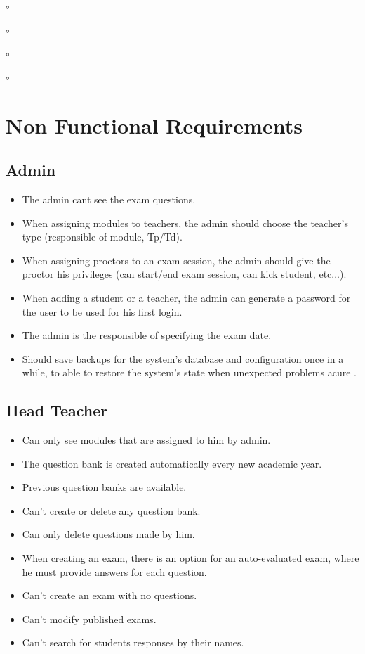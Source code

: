\documentclass[]{uc2pfecaneva}
\begin{document}
\begin{list}{$\circ$}{}
\begin{list}{$\circ$}{}
\begin{list}{$\circ$}{}
\begin{list}{$\circ$}{}
    \raggedright\section{Non Functional Requirements}
    \raggedright\subsection{Admin}
    \begin{itemize}
        \item The admin cant see the exam questions.
        \item When assigning modules to teachers, the admin should choose the teacher’s type (responsible of module, Tp/Td).
        \item When assigning proctors to an exam session, the admin should give the proctor his privileges (can start/end exam session, can kick student, etc...).
        \item When adding a student or a teacher, the admin can generate a password for the user to be used for his first login.
        \item The admin is the responsible of specifying the exam date.
        \item Should save backups for the system’s database and configuration once in a while, to able to restore the system’s state when  unexpected problems acure .

    \end{itemize}

    \raggedright\subsection{Head Teacher}
    \begin{itemize}
        \item Can only see modules that are assigned to him by admin.
        \item The question bank is created automatically every new academic year.
        \item Previous question banks are available.
        \item Can’t create or delete any question bank.
        \item Can only delete questions made by him.
        \item When creating an exam, there is an option for an auto-evaluated exam, where he must provide answers for each question.
        \item Can’t create an exam with no questions.
        \item Can’t modify published exams.
        \item Can’t search for students responses by their names.
    \end{itemize}


\end{list}
\end{list}
\end{list}
\end{list}
\end{document}
